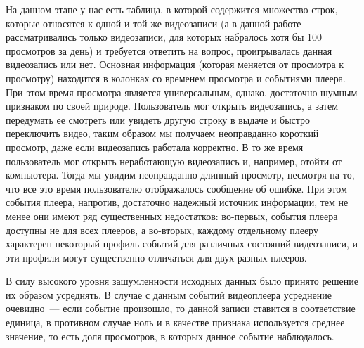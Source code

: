 На данном этапе у нас есть таблица, в которой содержится множество строк, которые относятся к одной и той же видеозаписи (а в данной работе рассматривались только видеозаписи, для которых набралось хотя бы 100 просмотров за день) и требуется ответить на вопрос, проигрывалась данная видеозапись или нет. Основная информация (которая меняется от просмотра к просмотру) находится в колонках со временем просмотра и событиями плеера. При этом время просмотра является универсальным, однако, достаточно шумным признаком по своей природе. Пользователь мог открыть видеозапись, а затем передумать ее смотреть или увидеть другую строку в выдаче и быстро переключить видео, таким образом мы получаем неоправданно короткий просмотр, даже если видеозапись работала корректно. В то же время пользователь мог открыть неработающую видеозапись и, например, отойти от компьютера. Тогда мы увидим неоправданно длинный просмотр, несмотря на то, что все это время пользователю отображалось сообщение об ошибке. При этом события плеера, напротив, достаточно надежный источник информации, тем не менее они имеют ряд существенных недостатков: во-первых, события плеера доступны не для всех плееров, а во-вторых, каждому отдельному плееру характерен некоторый профиль событий для различных состояний видеозаписи, и эти профили могут существенно отличаться для двух разных плееров.

В силу высокого уровня зашумленности исходных данных было принято решение их образом усреднять. В случае с данным событий видеоплеера усреднение очевидно~--- если событие произошло, то данной записи ставится в соответствие единица, в противном случае ноль и в качестве признака используется среднее значение, то есть доля просмотров, в которых данное событие наблюдалось.

